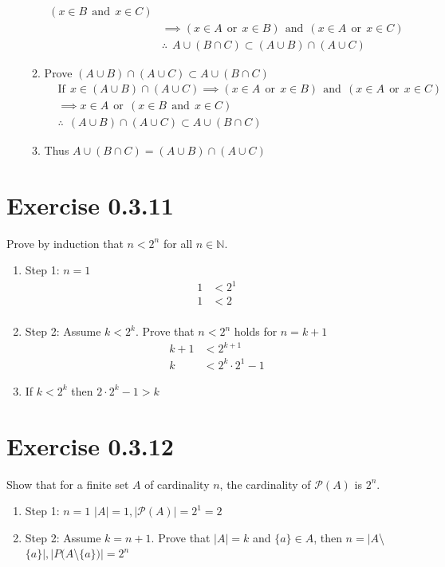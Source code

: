 \begin{enumerate}
\begin{enumerate}
\begin{align*}
        (x \in B \ \ \text{and} \ \ x \in C) \\
        &\implies (x \in A \ \ \text{or} \ \ x \in B) \ \ \text{and} \ \ 
        (x \in A \ \ \text{or} \ \ x \in C) \\
        &\therefore \ \ A \cup (B \cap C) \subset (A \cup B) \cap (A \cup C)
      \end{align*}
      \item Prove $(A \cup B) \cap (A \cup C) \subset A \cup (B \cap C)$
      \begin{align*}
        &\text{If}\ \ x \in (A \cup B) \cap (A \cup C) \implies
        (x \in A \ \ \text{or} \ \ x \in B) \ \ \text{and} \ \
        (x \in A \ \ \text{or} \ \ x \in C) \\
        &\implies x \in A \ \ \text{or} \ \ (x \in B \ \ \text{and} \ \ x \in C) \\
        &\therefore \ \ (A \cup B) \cap (A \cup C) \subset A \cup (B \cap C)
      \end{align*}
      \item Thus $A \cup (B \cap C) = (A \cup B) \cap (A \cup C)$ \qedsymbol{}
    \end{enumerate}
  \end{enumerate}
\section*{Exercise 0.3.11}
  Prove by induction that $n < 2^n$ for all $n \in \mathbb{N}$.
  \begin{enumerate}
    \item Step 1: $n = 1$
    \begin{align*}
      1 &< 2^1 \\
      1 &< 2 \\
    \end{align*}
    \item Step 2: Assume $k < 2^k$. Prove that $n < 2^n$ holds for $n=k+1$
    \begin{align*}
      k+1 &< 2^{k+1} \\
      k &< 2^k \cdot 2^1 - 1
    \end{align*}
    \item If $k < 2^k$ then $2 \cdot 2^k - 1 > k$ \qedsymbol{}
  \end{enumerate}
\section*{Exercise 0.3.12}
  Show that for a finite set $A$ of cardinality $n$,
  the cardinality of $\mathcal{P}(A)$ is $2^n$.
  \begin{enumerate}
    \item Step 1: $n=1$ $|A|=1, |\mathcal{P}(A)| = 2^1 = 2$
    \item Step 2: Assume $k = n + 1$. Prove that $|A|=k$ and $\{a\} \in A$,
      then $n=|A$\textbackslash$\{a\}|,|P(A$\textbackslash$\{a\})|=2^n$
  \end{enumerate}

